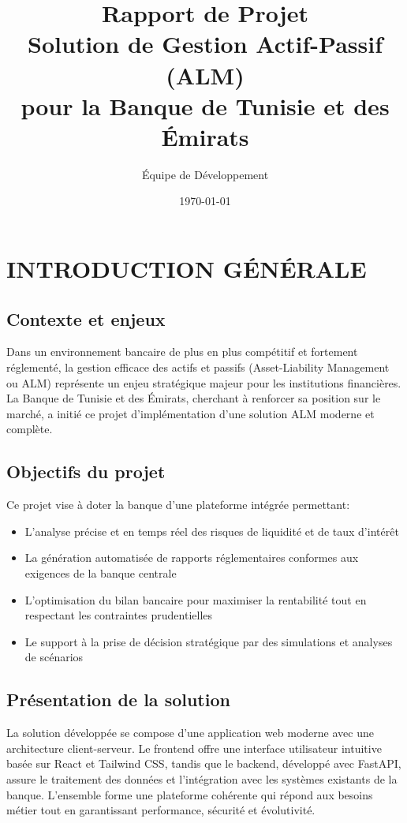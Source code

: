 \documentclass[12pt,a4paper]{report}
\title{\Huge\textbf{Rapport de Projet\\
Solution de Gestion Actif-Passif (ALM)\\
pour la Banque de Tunisie et des Émirats}}
\author{Équipe de Développement}
\date{\today}
\begin{document}
\maketitle
\thispagestyle{empty}

\tableofcontents
\thispagestyle{empty}
\clearpage

\chapter*{INTRODUCTION GÉNÉRALE}

\section*{Contexte et enjeux}
Dans un environnement bancaire de plus en plus compétitif et fortement réglementé, la gestion efficace des actifs et passifs (Asset-Liability Management ou ALM) représente un enjeu stratégique majeur pour les institutions financières. La Banque de Tunisie et des Émirats, cherchant à renforcer sa position sur le marché, a initié ce projet d'implémentation d'une solution ALM moderne et complète.

\section*{Objectifs du projet}
Ce projet vise à doter la banque d'une plateforme intégrée permettant:
\begin{itemize}
    \item L'analyse précise et en temps réel des risques de liquidité et de taux d'intérêt
    \item La génération automatisée de rapports réglementaires conformes aux exigences de la banque centrale
    \item L'optimisation du bilan bancaire pour maximiser la rentabilité tout en respectant les contraintes prudentielles
    \item Le support à la prise de décision stratégique par des simulations et analyses de scénarios
\end{itemize}

\section*{Présentation de la solution}
La solution développée se compose d'une application web moderne avec une architecture client-serveur. Le frontend offre une interface utilisateur intuitive basée sur React et Tailwind CSS, tandis que le backend, développé avec FastAPI, assure le traitement des données et l'intégration avec les systèmes existants de la banque. L'ensemble forme une plateforme cohérente qui répond aux besoins métier tout en garantissant performance, sécurité et évolutivité.
\end{document}
